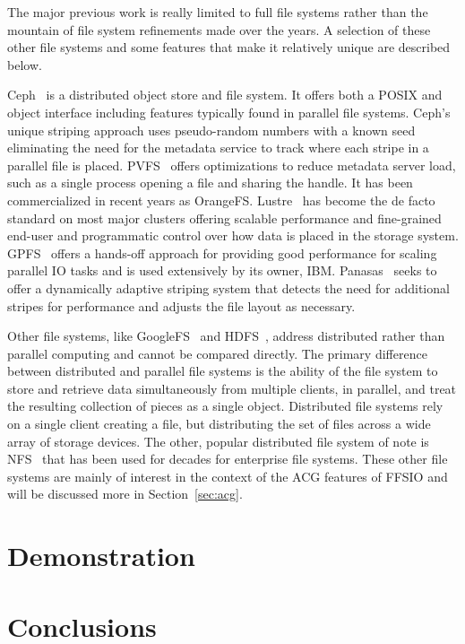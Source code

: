 \documentclass{sig-alt-gov2}
\begin{document}
The major previous work is really limited to full file systems rather than the
mountain of file system refinements made over the years. A selection of these
other file systems and some features that make it relatively unique are
described below.

Ceph~\cite{weil:ceph} is a distributed object store and file system. It offers
both a POSIX and object interface including features typically found in parallel
file systems.
Ceph's unique striping approach uses pseudo-random numbers with a
known seed eliminating the need for the metadata service to track where each
stripe in a parallel file is placed.
PVFS~\cite{carns:pvfs} offers optimizations to reduce metadata server load,
such as a single process opening a file and sharing the handle.
It has been
commercialized in recent years as OrangeFS.
Lustre~\cite{braam:lustre-arch} has become the de facto standard on most major
clusters offering scalable performance and fine-grained end-user and
programmatic control over how data is placed in the storage system.
GPFS~\cite{schmuck:gpfs} offers a hands-off approach for providing good
performance for scaling parallel IO tasks and is used extensively by its owner,
IBM.
Panasas~\cite{panasas:architecture} seeks to offer a dynamically adaptive
striping system that detects the need for additional stripes for performance
and adjusts the file layout as necessary.

Other file systems, like GoogleFS~\cite{ghemawat:googlefs} and
HDFS~\cite{Shvachko:2010:hdfs}, address distributed rather than parallel
computing and cannot be compared directly.
The primary difference between
distributed and parallel file systems is the ability of the file system to
store and retrieve data simultaneously from multiple clients, in parallel, and
treat the resulting collection of pieces as a single object.  Distributed file
systems rely on a single client creating a file, but distributing the set of
files across a wide array of storage devices.
The other, popular distributed
file system of note is NFS~\cite{powlowski:1994:nfs3} that has been used for
decades for enterprise file systems.
These other file systems are mainly of
interest in the context of the ACG features of FFSIO and will be discussed more
in Section~\ref{sec:acg}.

\section{Demonstration}
\label{sec:evaluation}


\section{Conclusions}
\label{sec:conclusion}
\end{document}
